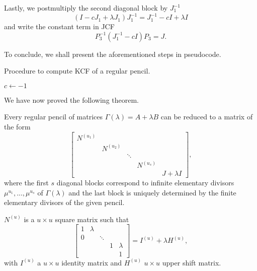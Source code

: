 Lastly, we postmultiply the second diagonal block by \(J_{1}^{-1}\)
\[
    (I - cJ_{1} + \lambda J_{1}) J_{1}^{-1} = J_{1}^{-1} - cI + \lambda I
\]
and write the constant term in JCF
\[
    P_{3}^{-1} (J_{1}^{-1} - cI) P_{3} = J.
\]

To conclude, we shall present the aforementioned steps in pseudocode.
\begin{algorithm}
    \caption{Procedure to compute KCF of a regular pencil.}\label{alg:kcf-regular}
    $c \gets -1$\;
\end{algorithm}

We have now proved the following theorem.
\begin{theorem}
    Every regular pencil of matrices \(\Gamma(\lambda) = A + \lambda B\) can be reduced to a matrix of the form
    \[
        \begin{bmatrix}
            N^{(u_{1})} \\
            & N^{(u_{2})} \\
            & & \ddots \\
            & & & N^{(u_{s})} \\
            & & & & J + \lambda I
        \end{bmatrix},
    \]
    where the first \(s\) diagonal blocks correspond to infinite elementary divisors
    \(\mu^{u_{1}}, ..., \mu^{u_{s}}\) of \(\Gamma(\lambda)\) and the last block is uniquely determined by the
    finite elementary divisors of the given pencil.

    \(N^{(u)}\) is a \(u \times u\) square matrix such that
    \[
        \begin{bmatrix}
            1 & \lambda & & & \\
            0 & & \ddots & & \\
            & & & 1 & \lambda \\
            & & & & 1
        \end{bmatrix}
        = I^{(u)} + \lambda H^{(u)},
    \]
    with \(I^{(u)}\) a \(u \times u\) identity matrix and \(H^{(u)}\) \(u \times u\) upper shift matrix.
\end{theorem}

